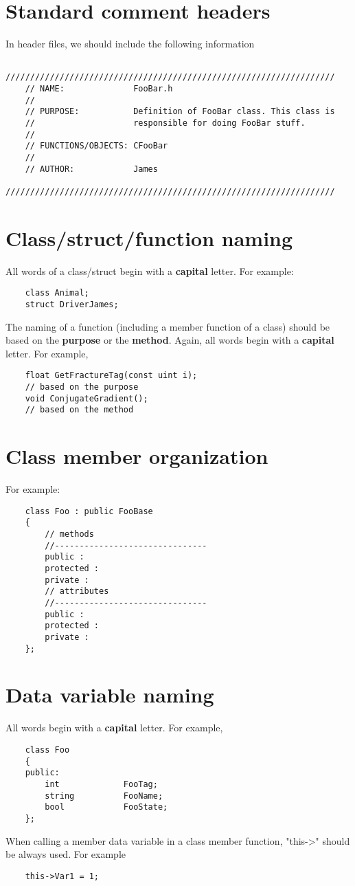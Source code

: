 \documentclass{article}
\begin{document}
\section{Standard comment headers}
In header files, we should include the following information
\begin{lstlisting}
	///////////////////////////////////////////////////////////////////
	// NAME:	          FooBar.h
	//
	// PURPOSE:	          Definition of FooBar class. This class is
	//	                  responsible for doing FooBar stuff.
	//
	// FUNCTIONS/OBJECTS: CFooBar
	//
	// AUTHOR:	          James
	///////////////////////////////////////////////////////////////////	
\end{lstlisting}

\section{Class/struct/function naming}
All words of a class/struct begin with a \textbf{capital} letter. For example:
\begin{lstlisting}
	class Animal;
	struct DriverJames;
\end{lstlisting}

The naming of a function (including a member function of a class) should be based on the \textbf{purpose} or the \textbf{method}. Again, all words begin with a \textbf{capital} letter. For example,
\begin{lstlisting}
	float GetFractureTag(const uint i); 
	// based on the purpose
	void ConjugateGradient(); 
	// based on the method
\end{lstlisting}

\section{Class member organization}
For example:
\begin{lstlisting}
	class Foo : public FooBase
	{
		// methods
		//-------------------------------
		public :
		protected :
		private :
		// attributes
		//-------------------------------
		public :
		protected :
		private :
	};
\end{lstlisting}

\section{Data variable naming}
All words begin with a \textbf{capital} letter. For example,
\begin{lstlisting}
	class Foo
	{
	public:
		int             FooTag;
		string          FooName;
		bool            FooState;
	};
\end{lstlisting}
When calling a member data variable in a class member function, "this->" should be always used. For example
\begin{lstlisting}
	this->Var1 = 1;
\end{lstlisting}
\end{document}
